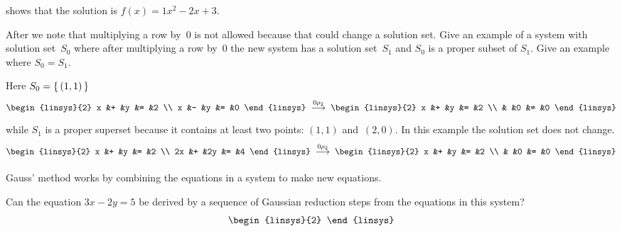 \begin{exercises}
\begin{answer}
      shows that the solution is \( f(x)=1x^2-2x+3 \).  
      \end{answer}
  \item After  we note that multiplying a 
   row by~$0$ is not allowed because that could change a solution set. 
   Give an example of a system with solution set~$S_0$ where after 
   multiplying a row by~$0$ the new system has a solution set~$S_1$
   and $S_0$ is a proper subset of $S_1$.
   Give an example where $S_0=S_1$. 
   \begin{answer}
     Here $S_0=\mbox{$\{\,(1,1)\,\}$}$
     \begin{equation*}
         \begin{linsys}{2}
            x  &+  &y  &=  &2  \\
            x  &-  &y  &=  &0
          \end{linsys}               
         \;\grstep{0\rho_2}\;
         \begin{linsys}{2}
            x  &+  &y  &=  &2  \\
               &   &0  &=  &0
          \end{linsys}               
     \end{equation*}
     while $S_1$ is a proper superset because it
     contains at least two points: $(1,1)$ and~$(2,0)$.
     In this example the solution set does not change.  
     \begin{equation*}
         \begin{linsys}{2}
            x  &+  &y  &=  &2  \\
           2x  &+  &2y &=  &4
          \end{linsys}               
         \;\grstep{0\rho_2}\;
         \begin{linsys}{2}
            x  &+  &y  &=  &2  \\
               &   &0  &=  &0
          \end{linsys}               
     \end{equation*}
   \end{answer}
  \item 
    Gauss' method works by combining the equations in a system to make new
    equations.
    \begin{exparts}
      \partsitem Can the equation \( 3x-2y=5 \) be derived by a sequence of
        Gaussian reduction steps from the equations in this system?
        \begin{equation*}
          \begin{linsys}{2}

\end{linsys}
\end{equation*}
\end{exparts}
\end{exercises}
